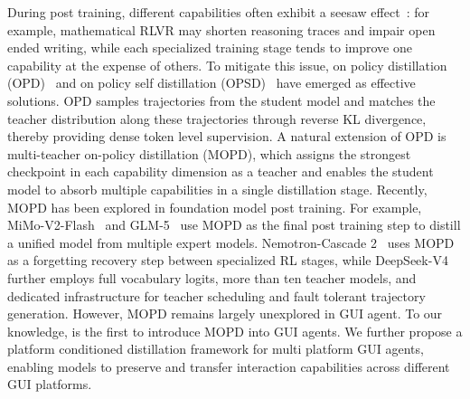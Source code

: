 During post training, different capabilities often exhibit a seesaw effect~\citep{scaling}: for example, mathematical RLVR may shorten reasoning traces and impair open ended writing, while each specialized training stage tends to improve one capability at the expense of others. To mitigate this issue, on policy distillation (OPD)~\citep{OPD, ExOPD, Uni-OPD} and on policy self distillation (OPSD)~\citep{OPSD, SDAR, SDFT} have emerged as effective solutions. OPD samples trajectories from the student model and matches the teacher distribution along these trajectories through reverse KL divergence, thereby providing dense token level supervision.
A natural extension of OPD is multi-teacher on-policy distillation (MOPD), which assigns the strongest checkpoint in each capability dimension as a teacher and enables the student model to absorb multiple capabilities in a single distillation stage. Recently, MOPD has been explored in foundation model post training. For example, MiMo-V2-Flash~\citep{Mimo-v2} and GLM-5~\citep{GLM-5} use MOPD as the final post training step to distill a unified model from multiple expert models. Nemotron-Cascade 2~\citep{Nemotron} uses MOPD as a forgetting recovery step between specialized RL stages, while DeepSeek-V4~\citep{DeepSeek-V4} further employs full vocabulary logits, more than ten teacher models, and dedicated infrastructure for teacher scheduling and fault tolerant trajectory generation.
However, MOPD remains largely unexplored in GUI agent. To our knowledge, \METHODNAME is the first to introduce MOPD into GUI agents. We further propose a platform conditioned distillation framework for multi platform GUI agents, enabling models to preserve and transfer interaction capabilities across different GUI platforms.
